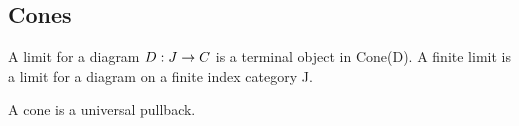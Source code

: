 \documentclass[../../notes.tex]{subfiles}
\begin{document}
\subsection{Cones}

\begin{definition}
  A limit for a diagram $D: J \rightarrow C $ is a terminal object in Cone(D). A finite limit is a limit for a diagram on a finite index category J.
\end{definition}

A cone is a universal pullback.

% 
\end{document}

